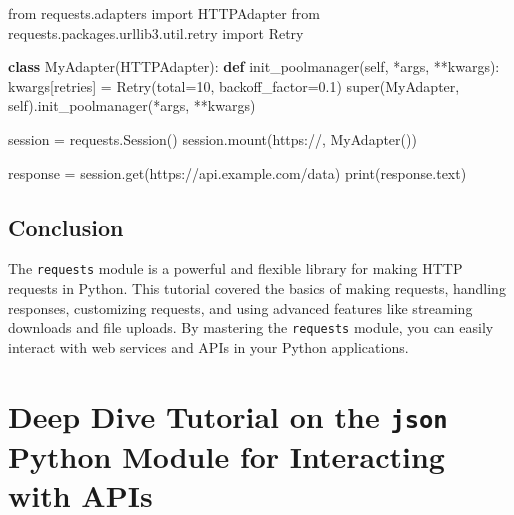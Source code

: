 \documentclass[
  letterpaper,
  DIV=11,
  numbers=noendperiod]{scrreprt}
\newenvironment{Shaded}{\begin{snugshade}}{\end{snugshade}}
\newcommand{\BuiltInTok}[1]{\textcolor[rgb]{0.00,0.23,0.31}{#1}}
\newcommand{\DecValTok}[1]{\textcolor[rgb]{0.68,0.00,0.00}{#1}}
\newcommand{\FloatTok}[1]{\textcolor[rgb]{0.68,0.00,0.00}{#1}}
\newcommand{\ImportTok}[1]{\textcolor[rgb]{0.00,0.46,0.62}{#1}}
\newcommand{\KeywordTok}[1]{\textcolor[rgb]{0.00,0.23,0.31}{\textbf{#1}}}
\newcommand{\NormalTok}[1]{\textcolor[rgb]{0.00,0.23,0.31}{#1}}
\newcommand{\OperatorTok}[1]{\textcolor[rgb]{0.37,0.37,0.37}{#1}}
\newcommand{\StringTok}[1]{\textcolor[rgb]{0.13,0.47,0.30}{#1}}
\newcommand{\VariableTok}[1]{\textcolor[rgb]{0.07,0.07,0.07}{#1}}
\begin{document}
\begin{Shaded}
\begin{Highlighting}[]
\ImportTok{from}\NormalTok{ requests.adapters }\ImportTok{import}\NormalTok{ HTTPAdapter}
\ImportTok{from}\NormalTok{ requests.packages.urllib3.util.retry }\ImportTok{import}\NormalTok{ Retry}

\KeywordTok{class}\NormalTok{ MyAdapter(HTTPAdapter):}
    \KeywordTok{def}\NormalTok{ init\_poolmanager(}\VariableTok{self}\NormalTok{, }\OperatorTok{*}\NormalTok{args, }\OperatorTok{**}\NormalTok{kwargs):}
\NormalTok{        kwargs[}\StringTok{\textquotesingle{}retries\textquotesingle{}}\NormalTok{] }\OperatorTok{=}\NormalTok{ Retry(total}\OperatorTok{=}\DecValTok{10}\NormalTok{, backoff\_factor}\OperatorTok{=}\FloatTok{0.1}\NormalTok{)}
        \BuiltInTok{super}\NormalTok{(MyAdapter, }\VariableTok{self}\NormalTok{).init\_poolmanager(}\OperatorTok{*}\NormalTok{args, }\OperatorTok{**}\NormalTok{kwargs)}

\NormalTok{session }\OperatorTok{=}\NormalTok{ requests.Session()}
\NormalTok{session.mount(}\StringTok{\textquotesingle{}https://\textquotesingle{}}\NormalTok{, MyAdapter())}

\NormalTok{response }\OperatorTok{=}\NormalTok{ session.get(}\StringTok{\textquotesingle{}https://api.example.com/data\textquotesingle{}}\NormalTok{)}
\BuiltInTok{print}\NormalTok{(response.text)}
\end{Highlighting}
\end{Shaded}

\section{Conclusion}\label{conclusion-25}

The \texttt{requests} module is a powerful and flexible library for
making HTTP requests in Python. This tutorial covered the basics of
making requests, handling responses, customizing requests, and using
advanced features like streaming downloads and file uploads. By
mastering the \texttt{requests} module, you can easily interact with web
services and APIs in your Python applications.


\chapter{\texorpdfstring{Deep Dive Tutorial on the \texttt{json} Python
Module for Interacting with
APIs}{Deep Dive Tutorial on the json Python Module for Interacting with APIs}}\label{deep-dive-tutorial-on-the-json-python-module-for-interacting-with-apis}
\end{document}
